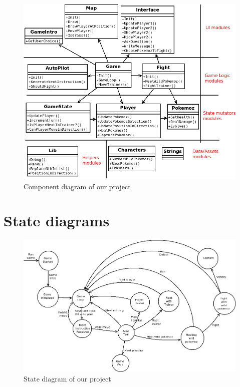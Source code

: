 \documentclass[10pt, a4paper]{article}
\begin{document}

\begin{figure}[!ht]

\includegraphics[width=\linewidth]{Diagramme1.png}
\caption{Component diagram of our project}
\end{figure}


\bigskip

\section{State diagrams}

\begin{figure}[!ht]
 \includegraphics[width=\linewidth]{State_diagram_oz.png}
 \caption{State diagram of our project}
\end{figure}
\end{document}
